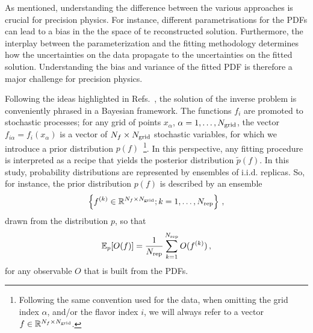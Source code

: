 As mentioned, understanding the difference between the various approaches is
crucial for precision physics. For instance, different parametrisations for the
PDFs can lead to a bias in the the space of te reconstructed solution.
Furthermore, the interplay between the parameterization and the fitting
methodology determines how the uncertainties on the data propagate to the
uncertainties on the fitted solution. Understanding the bias and variance of the
fitted PDF is therefore a major challenge for precision physics.

Following the ideas highlighted in
Refs.~\cite{DelDebbio:2021whr,Candido:2024hjt}, the solution of the inverse
problem is conveniently phrased in a Bayesian framework. The functions $f_i$ are
promoted to stochastic processes; for any grid of points $x_{\alpha}$,
$\alpha=1, \ldots, N_{\mathrm{grid}}$, the vector $f_{i\alpha}=f_{i}(x_{\alpha})$ is a
vector of $N_{f}\times N_{\mathrm{grid}}$ stochastic variables, for which we introduce a
prior distribution $p(f)$~\footnote{Following the same convention used for the
data, when omitting the grid index $\alpha$, and/or the flavor index $i$, we
will always refer to a vector $f \in \mathbb{R}^{N_{f}\times N_{\mathrm{grid}}}$.}. In this
perspective, any fitting procedure is interpreted as a recipe that yields the posterior
distribution $\tilde{p}(f)$. In this study, probability distributions are
represented by ensembles of i.i.d. replicas. So, for instance, the prior
distribution $p(f)$ is described by an ensemble
\begin{equation}
    \label{eq:RepDef}
    \left\{f^{(k)} \in \mathbb{R}^{N_{f}\times N_{\mathrm{grid}}}; k=1, \ldots, N_{\rm rep}\right\}\, ,
\end{equation}
drawn from the distribution $p$, so that
\begin{equation}
    \label{eq:ReplicaEnsemble}
    \mathbb{E}_{p}[O(f)] = \frac{1}{N_{\rm rep}} \sum_{k=1}^{N_{\rm rep}} O(f^{(k)})\, ,
\end{equation}
for any observable $O$ that is built from the PDFs.

